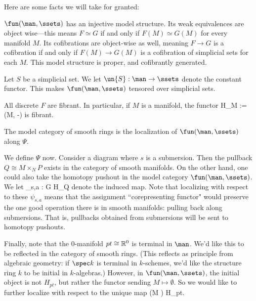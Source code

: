 Here are some facts we will take for granted:
\enum
	\item 
		$\fun(\man,\ssets)$ has an injective model structure. Its weak equivalences are object wise---this means $F \simeq G$ if and only if $F(M) \simeq G(M)$ for every manifold $M$. Its cofibrations are object-wise as well, meaning $F \to G$ is a cofibration if and only if $F(M) \to G(M)$ is a cofibration of simplicial sets for each $M$. This model structure is proper, and cofibrantly generated.
	\item
		Let $S$ be a simplicial set. We let $\un{S}: \man \to \ssets$ denote the constant functor. This makes $\fun(\man,\ssets)$ tensored over simplicial sets.
	\item
		All discrete $F$ are fibrant. In particular, if $M$ is a manifold, the functor
			\eqnn
			H_M := \man(M, -)
			\eqnd
		is fibrant.
\enumd

\begin{defn}
The model category of smooth rings is the localization of $\fun(\man,\ssets)$ along $\Psi$.
\end{defn}

We define $\Psi$ now.
Consider a diagram
	\eqnn
	\eqnd
where $s$ is a submersion. Then the pullback $Q \cong M \times_N P$ exists in the category of smooth manifolds. On the other hand, one could also take the homotopy pushout
	\eqnn
	\eqnd
in the model category $\fun(\man,\ssets)$. We let
	\eqnn
		\psi_{s,a} : G \to H_Q
	\eqnd 
denote the induced map. Note that localizing with respect to these $\psi_{s,a}$ means that the assignment ``corepresenting functor" would preserve the one good operation there is in smooth manifolds: pulling back along submersions. That is, pullbacks obtained from submersions will be sent to homotopy pushouts.

Finally, note that the 0-manifold $pt \cong \mathbb R^0$ is terminal in $\man$. We'd like this to be reflected in the category of smooth rings. (This reflects as principle from algebraic geometry: if $\spec k$ is terminal in $k$-schemes, we'd like the structure ring $k$ to be initial in $k$-algebras.) However, in $\fun(\man,\ssets)$, the initial object is not $H_{pt}$, but rather the functor sending $M \mapsto \emptyset$. So we would like to further localize with respect to the unique map
	\eqnn
	 (M \mapsto \emptyset) \to H_{pt}.
	\eqnd 


